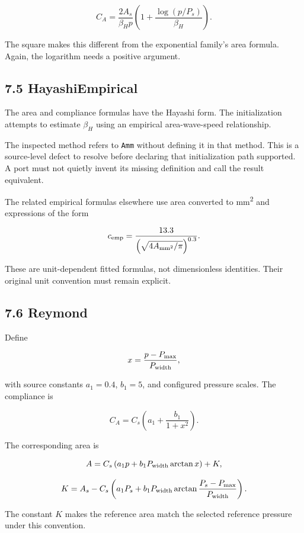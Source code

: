 \documentclass[11pt,a4paper]{article}
\begin{document}
\begingroup\small
\[
C_A=
\frac{2A_s}{\beta_Hp}
\left(1+\frac{\log(p/P_s)}{\beta_H}\right).
\]
\endgroup


The square makes this different from the exponential family's area formula. Again, the logarithm needs a positive argument.

\subsection{7.5 HayashiEmpirical}
The area and compliance formulas have the Hayashi form. The initialization attempts to estimate \(\beta_H\) using an empirical area-wave-speed relationship.

The inspected method refers to \texttt{Amm} without defining it in that method. This is a source-level defect to resolve before declaring that initialization path supported. A port must not quietly invent its missing definition and call the result equivalent.

The related empirical formulas elsewhere use area converted to mm\textsuperscript{2} and expressions of the form


\begingroup\small
\[
c_{\rm emp}
=\frac{13.3}{\left(\sqrt{4A_{\rm mm^2}/\pi}\right)^{0.3}}.
\]
\endgroup


These are unit-dependent fitted formulas, not dimensionless identities. Their original unit convention must remain explicit.

\subsection{7.6 Reymond}
Define


\begingroup\small
\[
x=\frac{p-P_{\max}}{P_{\rm width}},
\]
\endgroup


with source constants \(a_1=0.4\), \(b_1=5\), and configured pressure scales. The compliance is


\begingroup\small
\[
C_A=C_s\left(a_1+\frac{b_1}{1+x^2}\right).
\]
\endgroup


The corresponding area is


\begingroup\small
\[
A=C_s\left(a_1p+
b_1P_{\rm width}\arctan x\right)+K,
\]
\endgroup



\begingroup\small
\[
K=A_s-C_s\left(
a_1P_s+
b_1P_{\rm width}
\arctan\frac{P_s-P_{\max}}{P_{\rm width}}
\right).
\]
\endgroup


The constant \(K\) makes the reference area match the selected reference pressure under this convention.
\end{document}
